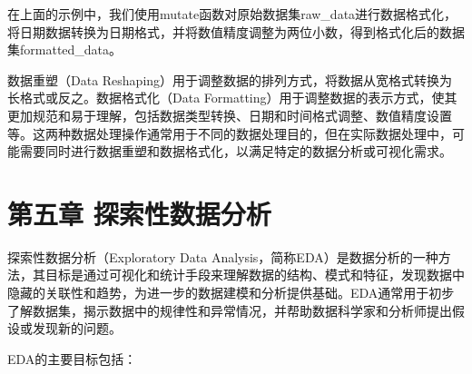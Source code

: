 \documentclass[]{book}
\newenvironment{Shaded}{\begin{snugshade}}{\end{snugshade}}
\newcommand{\CommentTok}[1]{\textcolor[rgb]{0.56,0.35,0.01}{\textit{#1}}}
\newcommand{\DataTypeTok}[1]{\textcolor[rgb]{0.13,0.29,0.53}{#1}}
\newcommand{\DecValTok}[1]{\textcolor[rgb]{0.00,0.00,0.81}{#1}}
\newcommand{\FloatTok}[1]{\textcolor[rgb]{0.00,0.00,0.81}{#1}}
\newcommand{\KeywordTok}[1]{\textcolor[rgb]{0.13,0.29,0.53}{\textbf{#1}}}
\newcommand{\NormalTok}[1]{#1}
\newcommand{\OperatorTok}[1]{\textcolor[rgb]{0.81,0.36,0.00}{\textbf{#1}}}
\newcommand{\StringTok}[1]{\textcolor[rgb]{0.31,0.60,0.02}{#1}}
\begin{document}
\begin{Shaded}
\end{Shaded}

在上面的示例中，我们使用mutate函数对原始数据集raw\_data进行数据格式化，将日期数据转换为日期格式，并将数值精度调整为两位小数，得到格式化后的数据集formatted\_data。

数据重塑（Data Reshaping）用于调整数据的排列方式，将数据从宽格式转换为长格式或反之。数据格式化（Data Formatting）用于调整数据的表示方式，使其更加规范和易于理解，包括数据类型转换、日期和时间格式调整、数值精度设置等。这两种数据处理操作通常用于不同的数据处理目的，但在实际数据处理中，可能需要同时进行数据重塑和数据格式化，以满足特定的数据分析或可视化需求。

\hypertarget{ux7b2cux4e94ux7ae0-ux63a2ux7d22ux6027ux6570ux636eux5206ux6790}{%
\chapter{第五章 探索性数据分析}\label{ux7b2cux4e94ux7ae0-ux63a2ux7d22ux6027ux6570ux636eux5206ux6790}}

探索性数据分析（Exploratory Data Analysis，简称EDA）是数据分析的一种方法，其目标是通过可视化和统计手段来理解数据的结构、模式和特征，发现数据中隐藏的关联性和趋势，为进一步的数据建模和分析提供基础。EDA通常用于初步了解数据集，揭示数据中的规律性和异常情况，并帮助数据科学家和分析师提出假设或发现新的问题。

EDA的主要目标包括：
\end{document}
